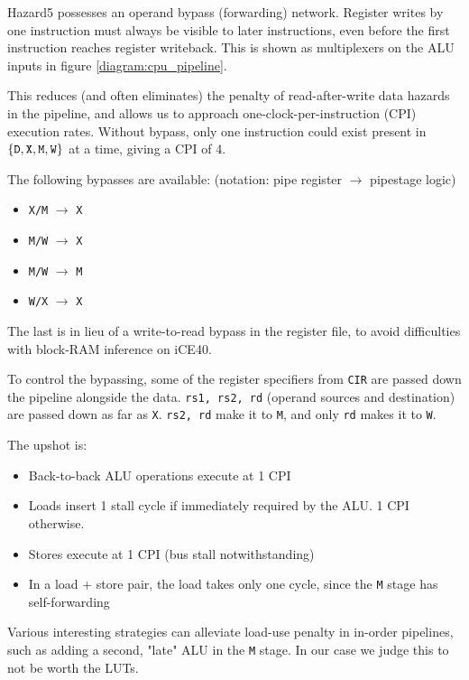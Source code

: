 \documentclass[notitlepage]{article}
\begin{document}
Hazard5 possesses an operand bypass (forwarding) network. Register writes by one instruction must always be visible to later instructions, even before the first instruction reaches register writeback. This is shown as multiplexers on the ALU inputs in figure \ref{diagram:cpu_pipeline}.

This reduces (and often eliminates) the penalty of read-after-write data hazards in the pipeline, and allows us to approach one-clock-per-instruction (CPI) execution rates. Without bypass, only one instruction could exist present in $\left\{ {\tt D}, {\tt X}, {\tt M}, {\tt W} \right\}$ at a time, giving a CPI of 4.

The following bypasses are available: (notation: pipe register $\to$ pipestage logic)

\begin{itemize}
	\item {\tt X/M} $\to$ {\tt X}
	\item {\tt M/W} $\to$ {\tt X}
	\item {\tt M/W} $\to$ {\tt M}
	\item {\tt W/X} $\to$ {\tt X}
\end{itemize}

The last is in lieu of a write-to-read bypass in the register file, to avoid difficulties with block-RAM inference on iCE40.

To control the bypassing, some of the register specifiers from {\tt CIR} are passed down the pipeline alongside the data. {\tt rs1, rs2, rd} (operand sources and destination) are passed down as far as {\tt X}. {\tt rs2, rd} make it to {\tt M}, and only {\tt rd} makes it to {\tt W}.

The upshot is:

\begin{itemize}
	\item Back-to-back ALU operations execute at 1 CPI
	\item Loads insert 1 stall cycle if immediately required by the ALU. 1 CPI otherwise.
	\item Stores execute at 1 CPI (bus stall notwithstanding)
	\item In a load + store pair, the load takes only one cycle, since the {\tt M} stage has self-forwarding
\end{itemize}

Various interesting strategies can alleviate load-use penalty in in-order pipelines, such as adding a second, "late" ALU in the {\tt M} stage. In our case we judge this to not be worth the LUTs.
\end{document}
